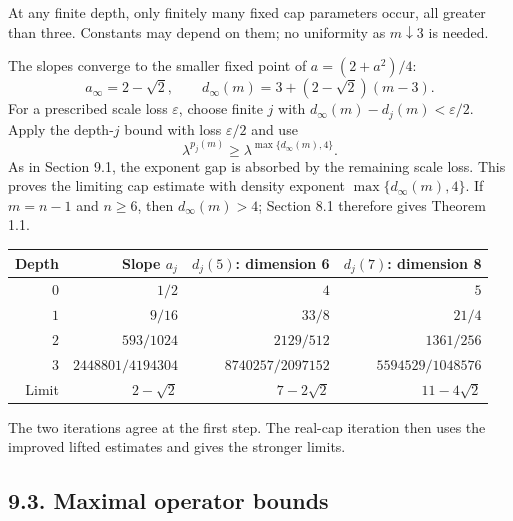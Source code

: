 \documentclass[
  11pt,
  a4paper,
]{article}
\begin{document}
At any finite depth, only finitely many fixed cap parameters occur, all
greater than three. Constants may depend on them; no uniformity as
\(m\downarrow3\) is needed.

The slopes converge to the smaller fixed point of \(a=(2+a^2)/4\): \[
 a_\infty=2-\sqrt2,\qquad
 d_\infty(m)=3+(2-\sqrt2)(m-3).                    \tag{9.6}\label{eq:9.6}
\] For a prescribed scale loss \(\varepsilon\), choose finite \(j\) with
\(d_\infty(m)-d_j(m)<\varepsilon/2\). Apply the depth-\(j\) bound with
loss \(\varepsilon/2\) and use \[
 \lambda^{p_j(m)}\ge
 \lambda^{\max\{d_\infty(m),4\}}.
\] As in Section 9.1, the exponent gap is absorbed by the remaining
scale loss. This proves the limiting cap estimate with density exponent
\(\max\{d_\infty(m),4\}\). If \(m=n-1\) and \(n\ge6\), then
\(d_\infty(m)>4\); Section 8.1 therefore gives Theorem 1.1.

\begin{center}
\small
\setlength{\tabcolsep}{5pt}
\begin{tabular}{@{}rrrr@{}}
\toprule
Depth & Slope $a_j$ & $d_j(5)$: dimension 6 & $d_j(7)$: dimension 8 \\
\midrule
$0$ & $1/2$ & $4$ & $5$ \\
$1$ & $9/16$ & $33/8$ & $21/4$ \\
$2$ & $593/1024$ & $2129/512$ & $1361/256$ \\
$3$ & $2448801/4194304$ & $8740257/2097152$ & $5594529/1048576$ \\
Limit & $2-\sqrt2$ & $7-2\sqrt2$ & $11-4\sqrt2$ \\
\bottomrule
\end{tabular}
\end{center}

The two iterations agree at the first step. The real-cap iteration then
uses the improved lifted estimates and gives the stronger limits.

\hypertarget{maximal-operator-bounds}{%
\subsection{9.3. Maximal operator
bounds}\label{maximal-operator-bounds}}
\end{document}
